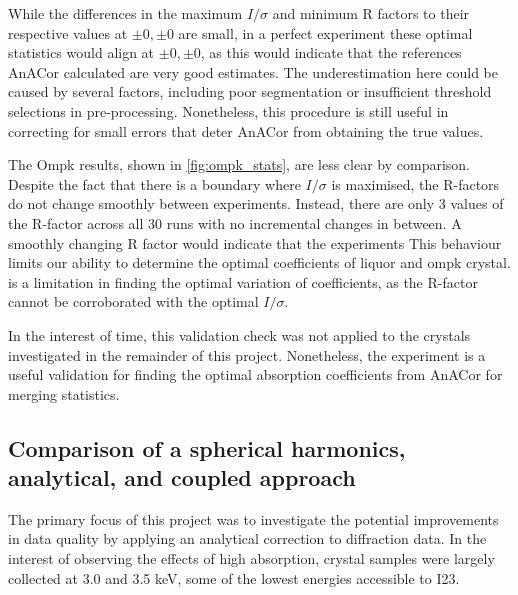 While the differences in the maximum $I/\sigma$ and minimum R factors to their respective values at $\pm0,\pm0$ are small, in a perfect experiment these optimal statistics would align at $\pm0,\pm0$, as this would indicate that the references AnACor calculated are very good estimates. The underestimation here could be caused by several factors, including poor segmentation or insufficient threshold selections in pre-processing. Nonetheless, this procedure is still useful in correcting for small errors that deter AnACor from obtaining the true values. 

The Ompk results, shown in \cref{fig:ompk_stats}, are less clear by comparison. Despite the fact that there is a boundary where $I/\sigma$ is maximised, the R-factors do not change smoothly between experiments. Instead, there are only 3 values of the R-factor across all 30 runs with no incremental changes in between. A smoothly changing R factor would indicate that the experiments This behaviour limits our ability to determine the optimal coefficients of liquor and ompk crystal. is a limitation in finding the optimal variation of coefficients, as the R-factor cannot be corroborated with the optimal $I/\sigma$.




In the interest of time, this validation check was not applied to the crystals investigated in the remainder of this project. Nonetheless, the experiment is a useful validation for finding the optimal absorption coefficients from AnACor for merging statistics. %


\subsection{Comparison of a spherical harmonics, analytical, and coupled approach} %
The primary focus of this project was to investigate the potential improvements in data quality by applying an analytical correction to diffraction data.
In the interest of observing the effects of high absorption, crystal samples were largely collected at 3.0 and 3.5 \unit{keV}, some of the lowest energies accessible to I23.

